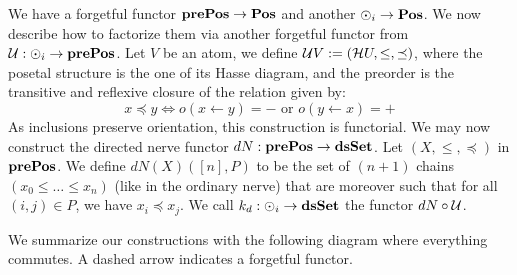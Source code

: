 We have a forgetful functor \( \mathbf{prePos} \to \mathbf{Pos} \) and another \( \odot_i \to \mathbf{Pos} \). We now describe how to factorize them via another forgetful functor from \( \mathcal{U} : \odot_i \to \mathbf{prePos} \). Let \( V \) be an atom, we define \( \mathcal{U} V := (\mathcal{H} U, \le, \preceq)  \), where the posetal structure is the one of its Hasse diagram, and the preorder is the transitive and reflexive closure of the relation given by:
\begin{equation*}
    x \preceq y \iff o(x \leftarrow y) = - \text{ or } o(y \leftarrow x) = +
\end{equation*}   
As inclusions preserve orientation, this construction is functorial. We may now construct the directed nerve functor \( dN : \mathbf{prePos} \to \mathbf{dsSet} \). Let \( (X, \le, \preceq) \) in \( \mathbf{prePos} \). We define \( dN(X)([n], P) \) to be the set of \( (n+1) \) chains \( (x_0 \le \dots \le x_n ) \) (like in the ordinary nerve) that are moreover such that for all \( (i, j) \in P \), we have \( x_i \preceq x_j \). We call \( k_d : \odot_i \to \mathbf{dsSet} \) the functor \( dN \circ \mathcal{U} \).

We summarize our constructions with the following diagram where everything commutes. A dashed arrow indicates a forgetful functor.
\begin{center}
\end{center}



